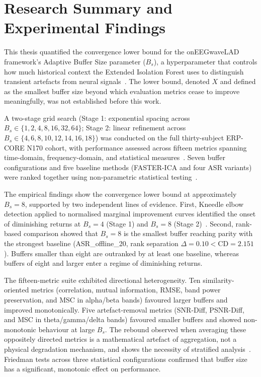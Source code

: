 \documentclass[MScCS,12pt,oneside,final]{uccthesis}
\begin{document}
\section{Research Summary and Experimental Findings}
\label{sec:research_summary}

This thesis quantified the convergence lower bound for the onEEGwaveLAD framework's Adaptive Buffer Size parameter ($B_s$), a hyperparameter that controls how much historical context the Extended Isolation Forest uses to distinguish transient artefacts from neural signals~\parencite{longo2025oneegwavelad}. The lower bound, denoted $X$ and defined as the smallest buffer size beyond which evaluation metrics cease to improve meaningfully, was not established before this work.

A two-stage grid search (Stage 1: exponential spacing across $B_s \in \{1,2,4,8,16,32,64\}$; Stage 2: linear refinement across $B_s \in \{4,6,8,10,12,14,16,18\}$) was conducted on the full thirty-subject ERP-CORE N170 cohort, with performance assessed across fifteen metrics spanning time-domain, frequency-domain, and statistical measures~\parencite{kappenman2021erp, satopaa2011finding}. Seven buffer configurations and five baseline methods (FASTER-ICA and four ASR variants) were ranked together using non-parametric statistical testing~\parencite{nolan2010faster, mullen2015real, friedman1937use}.

The empirical findings show the convergence lower bound at approximately $B_s = 8$, supported by two independent lines of evidence. First, Kneedle elbow detection applied to normalised marginal improvement curves identified the onset of diminishing returns at $B_s = 4$ (Stage 1) and $B_s = 8$ (Stage 2)~\parencite{satopaa2011finding}. Second, rank-based comparison showed that $B_s = 8$ is the smallest buffer reaching parity with the strongest baseline (ASR\_offline\_20, rank separation $\Delta = 0.10 < \mathrm{CD} = 2.151$). Buffers smaller than eight are outranked by at least one baseline, whereas buffers of eight and larger enter a regime of diminishing returns.

The fifteen-metric suite exhibited directional heterogeneity. Ten similarity-oriented metrics (correlation, mutual information, RMSE, band power preservation, and MSC in alpha/beta bands) favoured larger buffers and improved monotonically. Five artefact-removal metrics (SNR-Diff, PSNR-Diff, and MSC in theta/gamma/delta bands) favoured smaller buffers and showed non-monotonic behaviour at large $B_s$. The rebound observed when averaging these oppositely directed metrics is a mathematical artefact of aggregation, not a physical degradation mechanism, and shows the necessity of stratified analysis~\parencite{longo2025oneegwavelad}. Friedman tests across three statistical configurations confirmed that buffer size has a significant, monotonic effect on performance.
\end{document}

